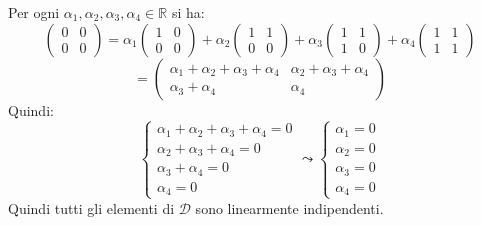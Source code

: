 \documentclass[a4paper]{article}
\theoremstyle{break}
\theoremstyle{break}
\theoremstyle{break}
\theoremstyle{break}
\begin{document}
\begin{enumerate}
\begin{itemize}
            \noindent Per ogni \( \alpha_1, \alpha_2, \alpha_3, \alpha_4 \in \mathbb{R} \) si ha:
            \[
              \begin{pmatrix} 
                0 & 0\\
                0 & 0
              \end{pmatrix} 
              =
              \alpha_1 \begin{pmatrix} 
                1 & 0\\
                0 & 0
              \end{pmatrix}
              +
              \alpha_2 \begin{pmatrix} 
                1 & 1\\
                0 & 0
              \end{pmatrix}
              +
              \alpha_3 \begin{pmatrix} 
                1 & 1\\
                1 & 0
              \end{pmatrix}
              +
              \alpha_4 \begin{pmatrix} 
                1 & 1\\
                1 & 1
              \end{pmatrix}
            \] 
            \[
              = \begin{pmatrix} 
                \alpha_1 + \alpha_2 + \alpha_3 + \alpha_4 & \alpha_2 + \alpha_3 + \alpha_4\\
                \alpha_3 + \alpha_4 & \alpha_4
              \end{pmatrix}
            \] 
            Quindi:
            \[
              \begin{cases}
                \alpha_1 + \alpha_2 + \alpha_3 + \alpha_4 = 0\\
                \alpha_2 + \alpha_3 + \alpha_4 = 0\\
                \alpha_3 + \alpha_4 = 0\\
                \alpha_4 = 0
              \end{cases}
              \leadsto
              \begin{cases}
                \alpha_1 = 0\\
                \alpha_2 = 0\\
                \alpha_3 = 0\\
                \alpha_4 = 0
              \end{cases}
            \] 
            Quindi tutti gli elementi di \( \mathcal{D} \) sono linearmente indipendenti.


\end{itemize}
\end{enumerate}
\end{document}
